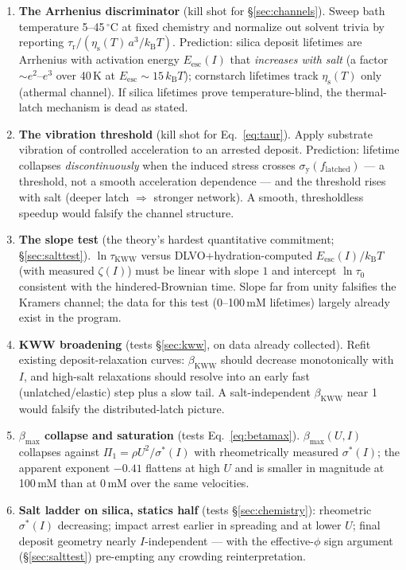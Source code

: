 \documentclass[11pt]{article}
\newcommand{\sigmastar}{\sigma^{*}}
\newcommand{\etas}{\eta_{\mathrm{s}}}
\begin{document}
\begin{enumerate}
\item \textbf{The Arrhenius discriminator} (kill shot for \S\ref{sec:channels}). Sweep bath temperature 5--45\,$^{\circ}$C at fixed chemistry and normalize out solvent trivia by reporting $\tau_{\mathrm{r}}/(\etas(T)\,a^{3}/k_{\mathrm{B}}T)$. Prediction: silica deposit lifetimes are Arrhenius with activation energy $E_{\mathrm{esc}}(I)$ that \emph{increases with salt} (a factor $\sim e^{2}$--$e^{3}$ over 40\,K at $E_{\mathrm{esc}}\!\sim\!15\,k_{\mathrm{B}}T$); cornstarch lifetimes track $\etas(T)$ only (athermal channel). If silica lifetimes prove temperature-blind, the thermal-latch mechanism is dead as stated.
\item \textbf{The vibration threshold} (kill shot for Eq.~\eqref{eq:taur}). Apply substrate vibration of controlled acceleration to an arrested deposit. Prediction: lifetime collapses \emph{discontinuously} when the induced stress crosses $\sigma_{\mathrm{y}}(f_{\mathrm{latched}})$ --- a threshold, not a smooth acceleration dependence --- and the threshold rises with salt (deeper latch $\Rightarrow$ stronger network). A smooth, thresholdless speedup would falsify the channel structure.
\item \textbf{The slope test} (the theory's hardest quantitative commitment; \S\ref{sec:salttest}). $\ln\tau_{\mathrm{KWW}}$ versus DLVO+hydration-computed $E_{\mathrm{esc}}(I)/k_{\mathrm{B}}T$ (with measured $\zeta(I)$) must be linear with slope $1$ and intercept $\ln\tau_{0}$ consistent with the hindered-Brownian time. Slope far from unity falsifies the Kramers channel; the data for this test (0--100\,mM lifetimes) largely already exist in the program.
\item \textbf{KWW broadening} (tests \S\ref{sec:kww}, on data already collected). Refit existing deposit-relaxation curves: $\beta_{\mathrm{KWW}}$ should decrease monotonically with $I$, and high-salt relaxations should resolve into an early fast (unlatched/elastic) step plus a slow tail. A salt-independent $\beta_{\mathrm{KWW}}$ near 1 would falsify the distributed-latch picture.
\item \textbf{$\beta_{\max}$ collapse and saturation} (tests Eq.~\eqref{eq:betamax}). $\beta_{\max}(U, I)$ collapses against $\Pi_{1} = \rho U^{2}/\sigmastar(I)$ with rheometrically measured $\sigmastar(I)$; the apparent exponent $-0.41$ flattens at high $U$ and is smaller in magnitude at 100\,mM than at 0\,mM over the same velocities.
\item \textbf{Salt ladder on silica, statics half} (tests \S\ref{sec:chemistry}): rheometric $\sigmastar(I)$ decreasing; impact arrest earlier in spreading and at lower $U$; final deposit geometry nearly $I$-independent --- with the effective-$\phi$ sign argument (\S\ref{sec:salttest}) pre-empting any crowding reinterpretation.

\end{enumerate}
\end{document}
